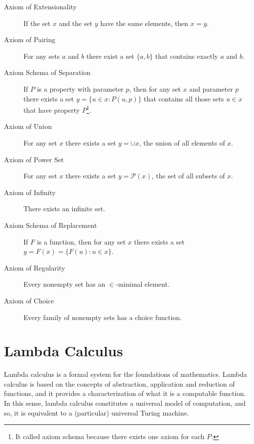 \begin{description}

\item[Axiom of Extensionality] If the set $x$ and the set $y$ have the same elements, then $x=y$.

\item[Axiom of Pairing] For any sets $a$ and $b$ there exist a set $\{a, b\}$ that contains exactly $a$ and $b$.

\item[Axiom Schema of Separation] If $P$ is a property with parameter $p$, then for any set $x$ and parameter $p$ there exists a set $y=\{u \in x : P(u,p) \}$ that contains all those sets $u \in x$ that have property $P$\footnote{It called axiom schema because there exists one axiom for each $P$.}.

\item[Axiom of Union] For any set $x$ there exists a set $y = \cup x$, the union of all elements of $x$. 

\item[Axiom of Power Set] For any set $x$ there exists a set $y = \mathcal{P}(x)$, the set of all subsets of $x$.

\item[Axiom of Infinity] There exists an infinite set.

\item[Axiom Schema of Replacement] If $F$ is a function, then for any set $x$ there exists a set $y = F(x) = \{F(u) : u \in x \}$. 

\item[Axiom of Regularity] Every nonempty set has an $\in$-minimal element.

\item[Axiom of Choice] Every family of nonempty sets has a choice function.

\end{description}


%
%

\section{Lambda Calculus}
\label{sec:lambda_calculus}

Lambda calculus is a formal system for the foundations of mathematics. Lambda calculus is based on the concepts of abstraction, application and reduction of functions, and it provides a characterization of what it is a computable function. In this sense, lambda calculus constitutes a universal model of computation, and so, it is equivalent to a (particular) universal Turing machine.


